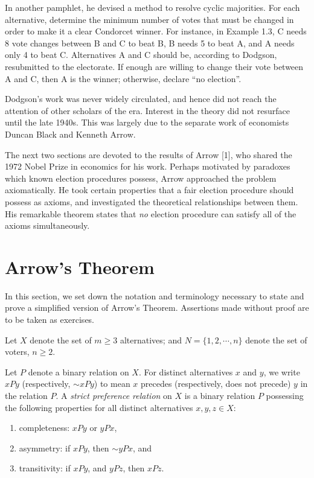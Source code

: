 \documentclass{article}
\begin{document}
In another pamphlet, he devised a method to resolve cyclic majorities. For each alternative, determine the minimum number of votes that must be changed in order to make it a clear Condorcet winner. For instance, in Example 1.3, C needs 8 vote changes between B and C to beat B, B needs 5 to beat A, and A needs only 4 to beat C. Alternatives A and C should be, according to Dodgson, resubmitted to the electorate. If enough are willing to change their vote between A and C, then A is the winner; otherwise, declare ``no election''.

Dodgson's work was never widely circulated, and hence did not reach the attention of other scholars of the era. Interest in the theory did not resurface until the late 1940s. This was largely due to the separate work of economists Duncan Black and Kenneth Arrow.

The next two sections are devoted to the results of Arrow [1], who shared the 1972 Nobel Prize in economics for his work. Perhaps motivated by paradoxes which known election procedures possess, Arrow approached the problem axiomatically. He took certain properties that a fair election procedure should possess as axioms, and investigated the theoretical relationships between them. His remarkable theorem states that \emph{no} election procedure can satisfy all of the axioms simultaneously.


\section{Arrow's Theorem}

In this section, we set down the notation and terminology necessary to state and prove a simplified version of Arrow's Theorem. Assertions made without proof are to be taken as exercises.

Let $X$ denote the set of $m \geq 3$ alternatives; and $N = \{ 1,2,\cdots,n \}$ denote the set of voters, $n \geq 2$.

Let $P$ denote a binary relation on $X$. For distinct alternatives $x$ and $y$, we write $xPy$ (respectively, $\sim xPy$) to mean $x$ precedes (respectively, does not precede) $y$ in the relation $P$. A \emph{strict preference relation} on $X$ is a binary relation $P$ possessing the following properties for all distinct alternatives $x, y, z \in X$:
\begin{enumerate}[\hspace{1cm}(a)]
  \item completeness: $xPy$ or $yPx$,
  \item asymmetry: if $xPy$, then $\sim yPx$, and
  \item transitivity: if $xPy$, and $yPz$, then $xPz$.
\end{enumerate}
\end{document}
